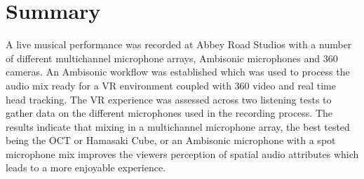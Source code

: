 
















\section{Summary}

	A live musical performance was recorded at Abbey Road Studios with a number of different multichannel microphone arrays, Ambisonic microphones and 360\textdegree{} cameras. An Ambisonic workflow was established which was used to process the audio mix ready for a VR environment coupled with 360\textdegree{} video and real time head tracking. The VR experience was assessed across two listening tests to gather data on the different microphones used in the recording process. The results indicate that mixing in a multichannel microphone array, the best tested being the OCT or Hamasaki Cube, or an Ambisonic microphone with a spot microphone mix improves the viewers perception of spatial audio attributes which leads to a more enjoyable experience.